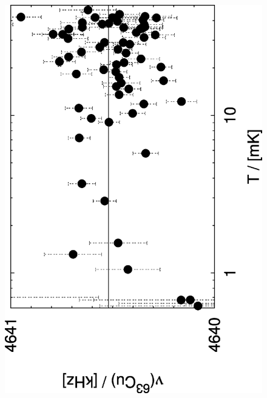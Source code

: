 \begin{figure}[htp]
\begin{center}
		\includegraphics[angle=-90,width=\ssmallwidth]{plots/knight_aug1197da_5}\\

\end{center}
\end{figure}

